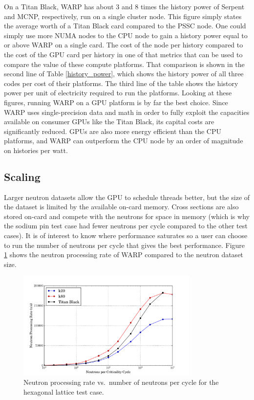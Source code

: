 \documentclass[preprint,12pt]{elsarticle}
\begin{document}
On a Titan Black, WARP has about 3 and 8 times the history power of Serpent and MCNP, respectively, run on a single cluster node.  This figure simply states the average worth of a Titan Black card compared to the PSSC node.  One could simply use more NUMA nodes to the CPU node to gain a history power equal to or above WARP on a single card. 
 The cost of the node per history compared to the cost of the GPU card per history  in one of that metrics that can be used to compare the value of these compute platforms.  That comparison is shown in the second line of Table \ref{history_power}, which shows the history power of all three codes per cost of their platforms.  The third line of the table shows the history power per unit of electricity required to run the platforms.  Looking at these figures, running WARP on a GPU platform is by far the best choice.  Since WARP uses single-precision data and math in order to fully exploit the capacities available on consumer GPUs like the Titan Black, its capital costs are significantly reduced.  GPUs are also more energy efficient than the CPU platforms, and WARP can outperform the CPU node by an order of magnitude on histories per watt.

\subsection{Scaling}

Larger neutron datasets allow the GPU to schedule threads better, but the size of the dataset is limited by the available on-card memory.  Cross sections are also stored on-card and compete with the neutrons for space in memory (which is why the sodium pin test case had fewer neutrons per cycle compared to the other test cases).  It is of interest to know where performance saturates so a user can choose to run the number of neutrons per cycle that gives the best performance.  Figure \ref{scaling} shows the neutron processing rate of WARP compared to the neutron dataset size.

\begin{figure}[h!]
\centering
\includegraphics[width=0.8\textwidth,trim= 1cm 0cm 1cm 0cm]{graphics/scaling.pdf}
\caption{Neutron processing rate vs.\ number of neutrons per cycle for the hexagonal lattice test case. \label{scaling} }
\end{figure}
\end{document}
